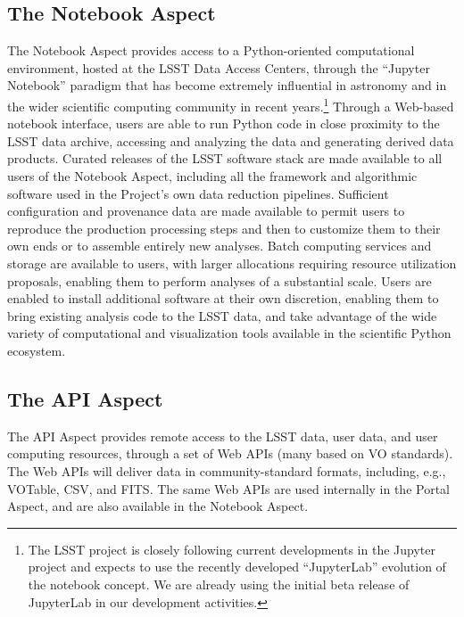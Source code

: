 \subsection{The Notebook Aspect}\label{notebook-aspect-intro}

The Notebook Aspect provides access to a Python-oriented computational environment, hosted at the LSST Data Access Centers, through the ``Jupyter Notebook'' paradigm that has become extremely influential in astronomy and in the wider scientific computing community in recent years.\footnote{The LSST project is closely following current developments in the Jupyter project and expects to use the recently developed ``JupyterLab'' evolution of the notebook concept.
We are already using the initial beta release of JupyterLab in our development activities.}
Through a Web-based notebook interface, users are able to run Python code in close proximity to the LSST data archive, accessing and analyzing the data and generating derived data products.
Curated releases of the LSST software stack are made available to all users of the Notebook Aspect, including all the framework and algorithmic software used in the Project's own data reduction pipelines.
Sufficient configuration and provenance data are made available to permit users to reproduce the production processing steps and then to customize them to their own ends or to assemble entirely new analyses.
Batch computing services and storage are available to users, with larger allocations requiring resource utilization proposals, enabling them to perform analyses of a substantial scale.
Users are enabled to install additional software at their own discretion, enabling them to bring existing analysis code to the LSST data, and take advantage of the wide variety of computational and visualization tools available in the scientific Python ecosystem.

\subsection{The API Aspect}\label{api-aspect-intro}

The API Aspect provides remote access to the LSST data, user data, and user computing resources, through a set of Web APIs
(many based on VO standards).
The Web APIs will deliver data in community-standard formats, including, e.g., VOTable, CSV, and FITS.
The same Web APIs are used internally in the Portal Aspect, and are also available in the Notebook Aspect.

